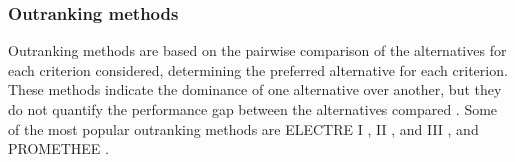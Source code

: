 \begin{refsection}[referencesCh1]

\subsubsection{Outranking methods}
Outranking methods are based on the pairwise comparison of the alternatives for each criterion considered, determining the preferred alternative for each criterion. These methods indicate the dominance of one alternative over another, but they do not quantify the performance gap between the alternatives compared \citep{giove2009decision}. Some of the most popular outranking methods are ELECTRE I \citep{roy1968classement}, II \citep{roy1973methode}, and III \citep{roy1978electre}, and PROMETHEE \citep{vincke1985preference}.


\end{refsection}
